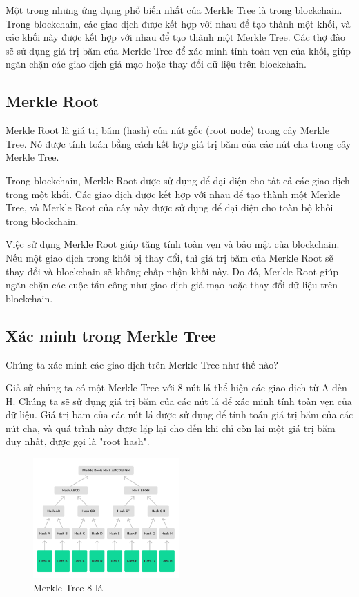 Một trong những ứng dụng phổ biến nhất của Merkle Tree là trong blockchain. Trong blockchain,
các giao dịch được kết hợp với nhau để tạo thành một khối, và các khối này được kết hợp với nhau 
để tạo thành một Merkle Tree. Các thợ đào sẽ sử dụng giá trị băm của Merkle Tree để xác minh tính 
toàn vẹn của khối, giúp ngăn chặn các giao dịch giả mạo hoặc thay đổi dữ liệu trên blockchain.


\subsection{Merkle Root}

Merkle Root là giá trị băm (hash) của nút gốc (root node) trong cây Merkle Tree. Nó được tính toán 
bằng cách kết hợp giá trị băm của các nút cha trong cây Merkle Tree.

Trong blockchain, Merkle Root được sử dụng để đại diện cho tất cả các giao dịch trong một khối. 
Các giao dịch được kết hợp với nhau để tạo thành một Merkle Tree, và Merkle Root của cây này 
được sử dụng để đại diện cho toàn bộ khối trong blockchain.

Việc sử dụng Merkle Root giúp tăng tính toàn vẹn và bảo mật của blockchain. Nếu một giao dịch trong khối bị thay đổi, thì giá trị băm của Merkle Root sẽ thay đổi và blockchain sẽ không chấp nhận khối này. Do đó, Merkle Root giúp ngăn chặn các cuộc tấn công như giao dịch giả mạo hoặc thay đổi dữ liệu trên blockchain.

\subsection{Xác minh trong Merkle Tree}

Chúng ta xác minh các giao dịch trên Merkle Tree như thế nào?

Giả sử chúng ta có một Merkle Tree với 8 nút lá thể hiện các giao dịch từ A đến H. Chúng ta sẽ sử dụng giá trị băm 
của các nút lá để xác minh tính toàn vẹn của dữ liệu. Giá trị băm của các nút lá 
được sử dụng để tính toán giá trị băm của các nút cha, và quá trình này được lặp 
lại cho đến khi chỉ còn lại một giá trị băm duy nhất, được gọi là "root hash". 

\begin{figure}[h]
    \centering
    \includegraphics[width=0.5\textwidth]{images/merkle-tree-8levels.png}
    \caption{Merkle Tree 8 lá}
    \label{fig:merkle_tree_8levels}
\end{figure}


